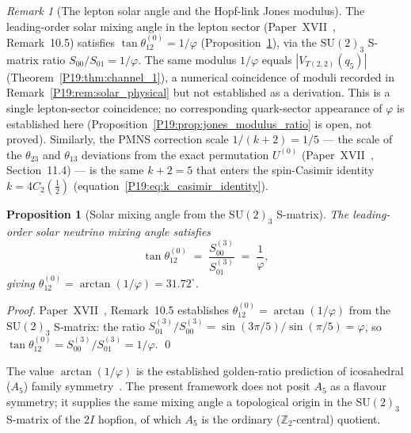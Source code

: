 \documentclass[11pt,a4paper]{article}
\newtheorem{proposition}[theorem]{Proposition}
\theoremstyle{definition}\newtheorem{definition}[theorem]{Definition}
\theoremstyle{remark}
\newtheorem{remark}[theorem]{Remark}
\newcommand{\vp}{\varphi}
\newcommand{\Jones}{V}
\begin{document}
\begin{remark}[The lepton solar angle and the Hopf-link Jones modulus]
\label{P19:rem:cross_sector_phi}
The leading-order solar mixing angle in the lepton sector
(Paper~XVII~\cite{Paper17}, Remark~10.5) %
satisfies $\tan\theta_{12}^{(0)}=1/\vp$
(Proposition~\ref{P19:prop:solar_angle_jones}), via the
$\mathrm{SU}(2)_3$ S-matrix ratio $S_{00}/S_{01}=1/\vp$. The same
modulus $1/\vp$ equals $|\Jones_{T(2,2)}(q_5)|$
(Theorem~\ref{P19:thm:channel_1}), a numerical coincidence of moduli
recorded in Remark~\ref{P19:rem:solar_physical} but not established
as a derivation. This is a single lepton-sector coincidence; no
corresponding quark-sector appearance of $\vp$ is established here
(Proposition~\ref{P19:prop:jones_modulus_ratio} is open, not proved).
Similarly, the PMNS correction scale $1/(k+2)=1/5$
--- the scale of the $\theta_{23}$ and $\theta_{13}$ deviations from the
exact permutation $U^{(0)}$ (Paper~XVII~\cite{Paper17},
Section~11.4) --- %
is the same $k+2=5$ that enters the spin-Casimir identity
$k=4C_2(\tfrac12)$ (equation~\eqref{P19:eq:k_casimir_identity}).
\end{remark}

\begin{proposition}[Solar mixing angle from the $\mathrm{SU}(2)_3$ S-matrix]
\label{P19:prop:solar_angle_jones}
The leading-order solar neutrino mixing angle satisfies
\begin{equation}
  \tan\theta_{12}^{(0)}
  \;=\; \frac{S_{00}^{(3)}}{S_{01}^{(3)}}
  \;=\; \frac{1}{\vp},
  \label{P19:eq:solar_angle_jones}
\end{equation}
giving $\theta_{12}^{(0)}=\arctan(1/\vp)=31.72^\circ$.
\end{proposition}

\begin{proof}
Paper~XVII~\cite{Paper17}, Remark~10.5 %
establishes $\theta_{12}^{(0)}=\arctan(1/\vp)$ from the
$\mathrm{SU}(2)_3$ S-matrix: the ratio
$S_{01}^{(3)}/S_{00}^{(3)}=\sin(3\pi/5)/\sin(\pi/5)=\vp$,
so $\tan\theta_{12}^{(0)}=S_{00}^{(3)}/S_{01}^{(3)}=1/\vp$.
\qed
\end{proof}

The value $\arctan(1/\vp)$ is the established golden-ratio prediction of
icosahedral ($A_5$) family symmetry~\cite{Everett2009}. The present
framework does not posit $A_5$ as a flavour symmetry; it supplies the
same mixing angle a topological origin in the $\mathrm{SU}(2)_3$
S-matrix of the $2I$ hopfion, of which $A_5$ is the ordinary
($\mathbb{Z}_2$-central) quotient.
\end{document}
